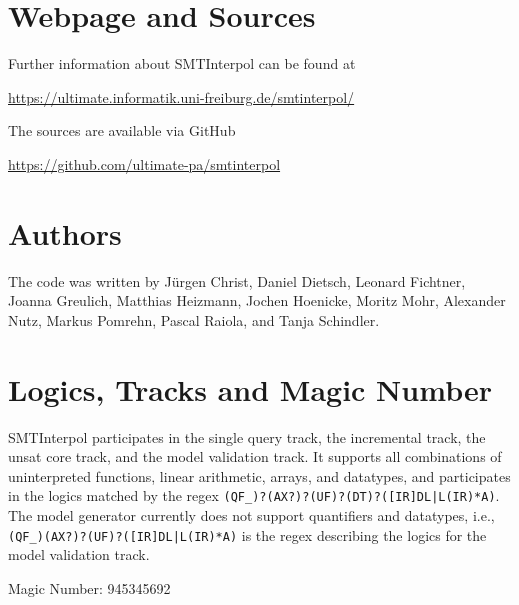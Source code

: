 \documentclass[a4paper]{easychair}
\newcommand\SI{SMTInterpol\xspace}
\begin{document}
\section*{Webpage and Sources}
Further information about \SI can be found at
\begin{center}
  \url{https://ultimate.informatik.uni-freiburg.de/smtinterpol/}
\end{center}
The sources are available via GitHub
\begin{center}
  \url{https://github.com/ultimate-pa/smtinterpol}
\end{center}

\section*{Authors}
The code was written by J{\"u}rgen Christ, Daniel Dietsch, Leonard Fichtner, Joanna Greulich, Matthias Heizmann, Jochen Hoenicke, Moritz Mohr, Alexander Nutz, Markus Pomrehn, Pascal Raiola, and Tanja Schindler.

\section*{Logics, Tracks and Magic Number}

\SI participates in the single query track, the incremental track, the unsat core track, and the model validation track.
It supports all combinations of uninterpreted functions, linear arithmetic, arrays, and datatypes, and participates in the logics matched by the regex
\verb!(QF_)?(AX?)?(UF)?(DT)?([IR]DL|L(IR)*A)!.
The model generator currently does not support quantifiers and datatypes, i.e.,
\verb!(QF_)(AX?)?(UF)?([IR]DL|L(IR)*A)! is the regex describing the
logics for the model validation track.

Magic Number: 945345692




\end{document}
